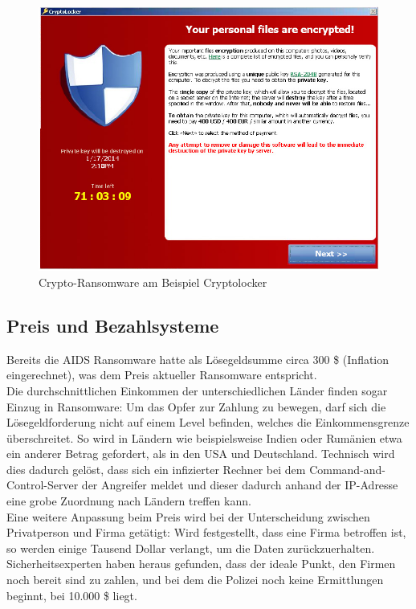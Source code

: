 \begin{figure}[h!]
	\centering
	\includegraphics[width=\textwidth]{img/cryptolocker.png}
	\caption{Crypto-Ransomware am Beispiel \glqq Cryptolocker\grqq \cite{evolution}}
	\label{fig:cryptolocker}
\end{figure}


\subsection{Preis und Bezahlsysteme}

Bereits die AIDS Ransomware hatte als Lösegeldsumme circa 300 \$ (Inflation eingerechnet), was dem Preis aktueller Ransomware entspricht. \cite{evolution}\\ 
Die durchschnittlichen Einkommen der unterschiedlichen Länder finden sogar Einzug in Ransomware: Um das Opfer zur Zahlung zu bewegen, darf sich die Lösegeldforderung nicht auf einem Level befinden, welches die Einkommensgrenze überschreitet. So wird in Ländern wie beispielsweise Indien oder Rumänien etwa ein anderer Betrag gefordert, als in den USA und Deutschland. Technisch wird dies dadurch gelöst, dass sich ein infizierter Rechner bei dem Command-and-Control-Server der Angreifer meldet und dieser dadurch anhand der IP-Adresse eine grobe Zuordnung nach Ländern treffen kann.\\

Eine weitere Anpassung beim Preis wird bei der Unterscheidung zwischen Privatperson und Firma getätigt: Wird festgestellt, dass eine Firma betroffen ist, so werden einige Tausend Dollar verlangt, um die Daten zurückzuerhalten. Sicherheitsexperten haben heraus gefunden, dass der ideale Punkt, den Firmen noch bereit sind zu zahlen, und bei dem die Polizei noch keine Ermittlungen beginnt, bei 10.000 \$ liegt. \cite{sweetspot}\\


